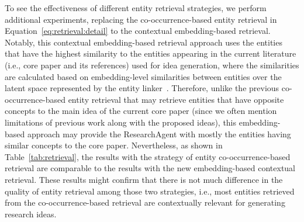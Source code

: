 \documentclass[11pt]{article}
\begin{document}
To see the effectiveness of different entity retrieval strategies, we perform additional experiments, replacing the co-occurrence-based entity retrieval in Equation~\ref{eq:retrieval:detail} to the contextual embedding-based retrieval. Notably, this contextual embedding-based retrieval approach uses the entities that have the highest similarity to the entities appearing in the current literature (i.e., core paper and its references) used for idea generation, where the similarities are calculated based on embedding-level similarities between entities over the latent space represented by the entity linker~\cite{blink}. Therefore, unlike the previous co-occurrence-based entity retrieval that may retrieve entities that have opposite concepts to the main idea of the current core paper (since we often mention limitations of previous work along with the proposed ideas), this embedding-based approach may provide the ResearchAgent with mostly the entities having similar concepts to the core paper. Nevertheless, as shown in Table~\ref{tab:retrieval}, the results with the strategy of entity co-occurrence-based retrieval are comparable to the results with the new embedding-based contextual retrieval. These results might confirm that there is not much difference in the quality of entity retrieval among those two strategies, i.e., most entities retrieved from the co-occurrence-based retrieval are contextually relevant for generating research ideas. 
\end{document}

